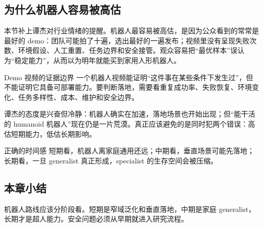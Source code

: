 \subsection{为什么机器人容易被高估}

本节补上谭杰对行业情绪的提醒。机器人最容易被高估，是因为公众看到的常常是最好的 demo：团队可能拍了十遍，选出最好的一遍发布；视频里没有呈现失败次数、环境假设、人工重置、任务边界和安全接管。观众容易把“最优样本”误认为“稳定能力”，从而以为明年就能买到家用人形机器人。

\begin{warningbox}{Demo 视频的证据边界}
一个机器人视频能证明“这件事在某些条件下发生过”，但不能证明它具备可部署能力。要判断落地，需要看重复成功率、失败恢复、环境变化、任务多样性、成本、维护和安全边界。
\end{warningbox}

谭杰的态度是兴奋但冷静：机器人确实在加速，落地场景也开始出现；但“能干活的 humanoid 机器人”现在仍是一片荒漠。真正应该避免的是同时犯两个错误：高估短期能力，低估长期影响。

\begin{importantbox}{正确的时间感}
短期看，机器人离家庭通用还远；中期看，垂直场景可能先落地；长期看，一旦 generalist 真正形成，specialist 的生存空间会被压缩。
\end{importantbox}

\subsection{本章小结}

机器人路线应该分阶段看。短期是窄域泛化和垂直落地，中期是家庭 generalist，长期才是超人能力。安全问题必须从早期就进入研究流程。

